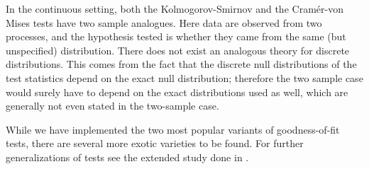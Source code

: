 
In the continuous setting, both the Kolmogorov-Smirnov and the Cram\'{e}r-von Mises tests have two sample analogues. Here data are
observed from two processes, and the hypothesis tested is whether they came from the same (but unspecified) distribution. There
does not exist an analogous theory for discrete distributions. This comes from the fact that the discrete null distributions
of the test statistics depend on the exact null distribution; therefore the two sample case would surely have to depend
on the exact distributions used as well, which are generally not even stated in the two-sample case. 

While we have implemented the two most popular variants of goodness-of-fit tests, there are 
several more exotic varieties to be found. For further generalizations of tests see the extended study done in \cite{dewev1973}.


%



\address{Taylor B. Arnold \\
Yale University\\
24 Hillhouse Ave. \\
New Haven, CT 06511
USA\\
}

\address{John W. Emerson \\
Yale University\\
24 Hillhouse Ave. \\
New Haven, CT 06511
USA\\
}

